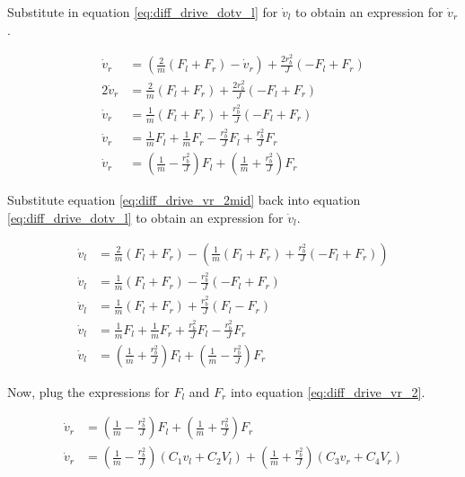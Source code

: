 Substitute in equation \eqref{eq:diff_drive_dotv_l} for $\dot{v}_l$ to obtain an
expression for $\dot{v}_r$.

\begin{align}
  \dot{v}_r &= \left(\frac{2}{m} (F_l + F_r) - \dot{v}_r\right) +
    \frac{2 r_b^2}{J} (-F_l + F_r) \nonumber \\
  2\dot{v}_r &= \frac{2}{m} (F_l + F_r) + \frac{2 r_b^2}{J} (-F_l + F_r)
    \nonumber \\
  \dot{v}_r &= \frac{1}{m} (F_l + F_r) + \frac{r_b^2}{J} (-F_l + F_r)
    \label{eq:diff_drive_vr_2mid} \\
  \dot{v}_r &= \frac{1}{m} F_l + \frac{1}{m} F_r - \frac{r_b^2}{J} F_l +
    \frac{r_b^2}{J} F_r \nonumber \\
  \dot{v}_r &= \left(\frac{1}{m} - \frac{r_b^2}{J}\right) F_l +
    \left(\frac{1}{m} + \frac{r_b^2}{J}\right) F_r \label{eq:diff_drive_vr_2}
\end{align}

Substitute equation \eqref{eq:diff_drive_vr_2mid} back into equation
\eqref{eq:diff_drive_dotv_l} to obtain an expression for $\dot{v}_l$.

\begin{align}
  \dot{v}_l &= \frac{2}{m} (F_l + F_r) - \left(\frac{1}{m} (F_l + F_r) +
    \frac{r_b^2}{J} (-F_l + F_r)\right) \nonumber \\
  \dot{v}_l &= \frac{1}{m} (F_l + F_r) - \frac{r_b^2}{J} (-F_l + F_r)
    \nonumber \\
  \dot{v}_l &= \frac{1}{m} (F_l + F_r) + \frac{r_b^2}{J} (F_l - F_r) \nonumber
    \\
  \dot{v}_l &= \frac{1}{m} F_l + \frac{1}{m} F_r + \frac{r_b^2}{J} F_l -
    \frac{r_b^2}{J} F_r \nonumber \\
  \dot{v}_l &= \left(\frac{1}{m} + \frac{r_b^2}{J}\right) F_l +
    \left(\frac{1}{m} - \frac{r_b^2}{J}\right) F_r \label{eq:diff_drive_vl_2}
\end{align}

Now, plug the expressions for $F_l$ and $F_r$ into equation
\eqref{eq:diff_drive_vr_2}.

\begin{align}
  \dot{v}_r &= \left(\frac{1}{m} - \frac{r_b^2}{J}\right) F_l +
    \left(\frac{1}{m} + \frac{r_b^2}{J}\right) F_r \nonumber \\
  \dot{v}_r &= \left(\frac{1}{m} - \frac{r_b^2}{J}\right)
    \left(C_1 v_l + C_2 V_l\right) +
    \left(\frac{1}{m} + \frac{r_b^2}{J}\right) \left(C_3 v_r + C_4 V_r\right)
    \label{eq:diff_drive_model_right}
\end{align}

